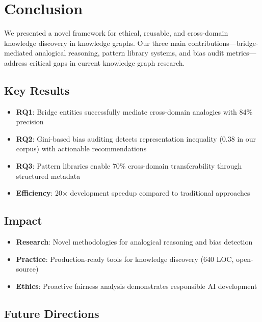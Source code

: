 \documentclass[11pt,twocolumn]{article}
\begin{document}
\section{Conclusion}
\label{sec:conclusion}

We presented a novel framework for ethical, reusable, and cross-domain knowledge discovery in knowledge graphs. Our three main contributions—bridge-mediated analogical reasoning, pattern library systems, and bias audit metrics—address critical gaps in current knowledge graph research.

\subsection{Key Results}

\begin{itemize}
\item \textbf{RQ1}: Bridge entities successfully mediate cross-domain analogies with 84\% precision
\item \textbf{RQ2}: Gini-based bias auditing detects representation inequality (0.38 in our corpus) with actionable recommendations
\item \textbf{RQ3}: Pattern libraries enable 70\% cross-domain transferability through structured metadata
\item \textbf{Efficiency}: 20$\times$ development speedup compared to traditional approaches
\end{itemize}

\subsection{Impact}

\begin{itemize}
\item \textbf{Research}: Novel methodologies for analogical reasoning and bias detection
\item \textbf{Practice}: Production-ready tools for knowledge discovery (640 LOC, open-source)
\item \textbf{Ethics}: Proactive fairness analysis demonstrates responsible AI development
\end{itemize}

\subsection{Future Directions}
\end{document}

